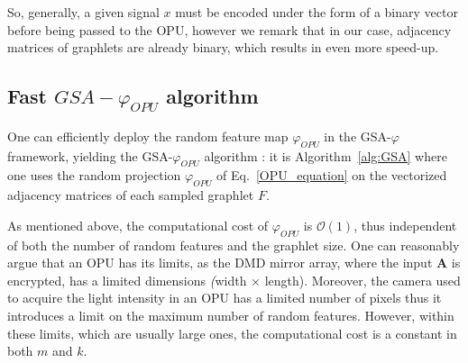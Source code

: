 So, generally, a given signal $x$ must be encoded under the form of a binary vector before being passed to the OPU, however we remark that in our case, adjacency matrices of graphlets are already binary, which results in even more speed-up. %

\subsection{Fast $GSA-\varphi_{OPU}$ algorithm}
One can efficiently deploy the random feature map $\varphi_{OPU}$ in the GSA-$\varphi$ framework, yielding the GSA-$\varphi_{OPU}$ algorithm : it is Algorithm~\ref{alg:GSA} where one uses the random projection $\varphi_{OPU}$ of Eq.~\eqref{OPU_equation} on the vectorized adjacency matrices of each sampled graphlet $F$.

As mentioned above, the computational cost of $\varphi_{OPU}$ is $\mathcal{O}(1)$, thus independent of both the number of random features and the graphlet size. One can reasonably argue that an OPU has its limits, as the DMD mirror array, where the input $\mathbf{A}$ is encrypted, has a limited dimensions \emph(width $\times$ length). Moreover, the camera used to acquire the light intensity in an OPU has a limited number of pixels thus it introduces a limit on the maximum number of random features. However, within these limits, which are usually large ones, the computational cost is a constant in both $m$ and $k$. 

